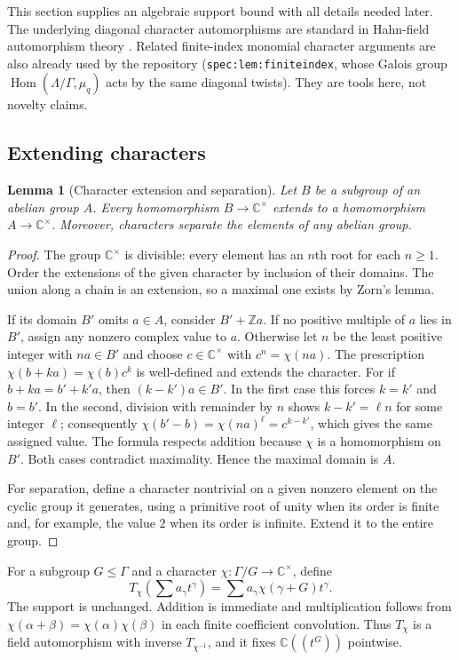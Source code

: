 \documentclass[11pt,oneside]{article}
\newtheorem{lemma}[theorem]{Lemma}
\theoremstyle{definition}
\theoremstyle{remark}
\newcommand{\C}{\mathbb C}
\newcommand{\Z}{\mathbb Z}
\newcommand{\lbl}[1]{\nolinkurl{#1}}%
\begin{document}
This section supplies an algebraic support bound with all details needed
later. The underlying diagonal character automorphisms are standard in
Hahn-field automorphism theory \cite{automorphisms}. Related finite-index
monomial character arguments are also already used by the repository
\cite{repo-spectral} (\lbl{spec:lem:finiteindex}, whose Galois group
$\operatorname{Hom}(\Lambda/\Gamma,\mu_q)$ acts by the same diagonal
twists). They are tools here, not novelty claims.

\subsection{Extending characters}

\begin{lemma}[Character extension and separation]\label{hnd:lem:characterextension}
Let $B$ be a subgroup of an abelian group $A$. Every homomorphism
$B\to\C^\times$ extends to a homomorphism $A\to\C^\times$.
Moreover, characters separate the elements of any abelian group.
\end{lemma}
\begin{proof}
The group $\C^\times$ is divisible: every element has an $n$th root
for each $n\ge1$. Order the extensions of the given character by inclusion
of their domains. The union along a chain is an extension, so a maximal
one exists by Zorn's lemma.

If its domain $B'$ omits $a\in A$, consider $B'+\Z a$.
If no positive multiple of $a$ lies in $B'$, assign any nonzero complex
value to $a$. Otherwise let $n$ be the least positive integer with
$na\in B'$ and choose $c\in\C^\times$ with
$c^n=\chi(na)$. The prescription
$\chi(b+ka)=\chi(b)c^k$ is well-defined and extends the character.
For if $b+ka=b'+k'a$, then $(k-k')a\in B'$. In the first case this
forces $k=k'$ and $b=b'$. In the second, division with remainder by
$n$ shows $k-k'=\ell n$ for some integer $\ell$; consequently
$\chi(b'-b)=\chi(na)^\ell=c^{k-k'}$, which gives the same assigned value.
The formula respects addition because $\chi$ is a homomorphism on $B'$.
Both cases contradict maximality. Hence the maximal domain is $A$.

For separation, define a character nontrivial on a given nonzero element
on the cyclic group it generates, using a primitive root of unity when
its order is finite and, for example, the value $2$ when its order is
infinite. Extend it to the entire group.
\end{proof}

For a subgroup $G\le\Gamma$ and a character
$\chi:\Gamma/G\to\C^\times$, define
\begin{equation}\label{hnd:eq:characteraction}
 T_\chi\!\left(\sum a_\gamma t^\gamma\right)
 =\sum a_\gamma\chi(\gamma+G)t^\gamma.
\end{equation}
The support is unchanged. Addition is immediate and multiplication
follows from $\chi(\alpha+\beta)=\chi(\alpha)\chi(\beta)$ in each
finite coefficient convolution. Thus $T_\chi$ is a field automorphism
with inverse $T_{\chi^{-1}}$, and it fixes $\C((t^G))$ pointwise.
\end{document}
